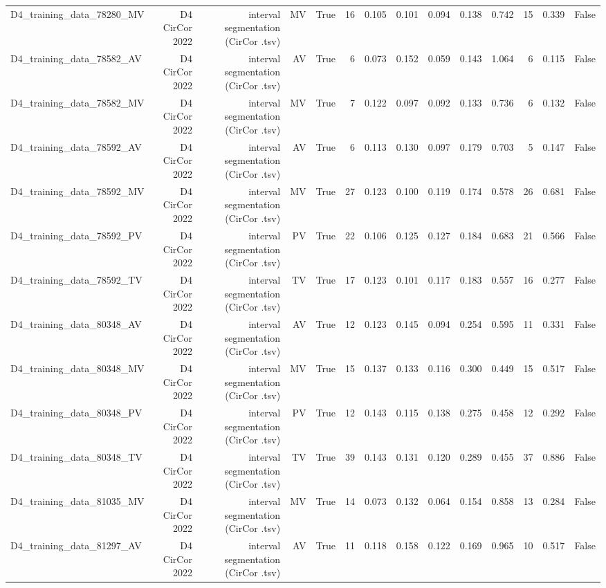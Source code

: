 \begin{table}[htbp]
\begin{tabular}{lrrrrrrrrrrrrr}
    D4\_training\_data\_78280\_MV & D4 CirCor 2022 & interval segmentation (CirCor .tsv) & MV & True & 16 & 0.105 & 0.101 & 0.094 & 0.138 & 0.742 & 15 & 0.339 & False \\
    D4\_training\_data\_78582\_AV & D4 CirCor 2022 & interval segmentation (CirCor .tsv) & AV & True & 6 & 0.073 & 0.152 & 0.059 & 0.143 & 1.064 & 6 & 0.115 & False \\
    D4\_training\_data\_78582\_MV & D4 CirCor 2022 & interval segmentation (CirCor .tsv) & MV & True & 7 & 0.122 & 0.097 & 0.092 & 0.133 & 0.736 & 6 & 0.132 & False \\
    D4\_training\_data\_78592\_AV & D4 CirCor 2022 & interval segmentation (CirCor .tsv) & AV & True & 6 & 0.113 & 0.130 & 0.097 & 0.179 & 0.703 & 5 & 0.147 & False \\
    D4\_training\_data\_78592\_MV & D4 CirCor 2022 & interval segmentation (CirCor .tsv) & MV & True & 27 & 0.123 & 0.100 & 0.119 & 0.174 & 0.578 & 26 & 0.681 & False \\
    D4\_training\_data\_78592\_PV & D4 CirCor 2022 & interval segmentation (CirCor .tsv) & PV & True & 22 & 0.106 & 0.125 & 0.127 & 0.184 & 0.683 & 21 & 0.566 & False \\
    D4\_training\_data\_78592\_TV & D4 CirCor 2022 & interval segmentation (CirCor .tsv) & TV & True & 17 & 0.123 & 0.101 & 0.117 & 0.183 & 0.557 & 16 & 0.277 & False \\
    D4\_training\_data\_80348\_AV & D4 CirCor 2022 & interval segmentation (CirCor .tsv) & AV & True & 12 & 0.123 & 0.145 & 0.094 & 0.254 & 0.595 & 11 & 0.331 & False \\
    D4\_training\_data\_80348\_MV & D4 CirCor 2022 & interval segmentation (CirCor .tsv) & MV & True & 15 & 0.137 & 0.133 & 0.116 & 0.300 & 0.449 & 15 & 0.517 & False \\
    D4\_training\_data\_80348\_PV & D4 CirCor 2022 & interval segmentation (CirCor .tsv) & PV & True & 12 & 0.143 & 0.115 & 0.138 & 0.275 & 0.458 & 12 & 0.292 & False \\
    D4\_training\_data\_80348\_TV & D4 CirCor 2022 & interval segmentation (CirCor .tsv) & TV & True & 39 & 0.143 & 0.131 & 0.120 & 0.289 & 0.455 & 37 & 0.886 & False \\
    D4\_training\_data\_81035\_MV & D4 CirCor 2022 & interval segmentation (CirCor .tsv) & MV & True & 14 & 0.073 & 0.132 & 0.064 & 0.154 & 0.858 & 13 & 0.284 & False \\
    D4\_training\_data\_81297\_AV & D4 CirCor 2022 & interval segmentation (CirCor .tsv) & AV & True & 11 & 0.118 & 0.158 & 0.122 & 0.169 & 0.965 & 10 & 0.517 & False \\

\end{tabular}
\end{table}
